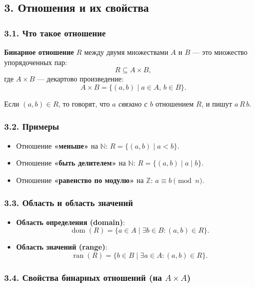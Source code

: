 \subsection{3. Отношения и их свойства}

\subsubsection{3.1. Что такое отношение}

\textbf{Бинарное отношение} $R$ между двумя множествами $A$ и $B$ — это множество упорядоченных пар:
\[
R \subseteq A \times B,
\]
где $A \times B$ — декартово произведение:
\[
A \times B = \{ (a, b) \mid a \in A,\, b \in B \}.
\]

Если $(a, b) \in R$, то говорят, что \textit{$a$ связано с $b$} отношением $R$, и пишут $a\,R\,b$.

\subsubsection{3.2. Примеры}

\begin{itemize}[leftmargin=*]
  \item Отношение \textbf{«меньше»} на $\mathbb{N}$: $R = \{(a, b) \mid a < b\}$.
  \item Отношение \textbf{«быть делителем»} на $\mathbb{N}$: $R = \{(a, b) \mid a \mid b\}$.
  \item Отношение \textbf{«равенство по модулю»} на $\mathbb{Z}$: $a \equiv b \pmod{n}$.
\end{itemize}

\subsubsection{3.3. Область и область значений}

\begin{itemize}[leftmargin=*]
  \item \textbf{Область определения (domain)}:
  \[
  \operatorname{dom}(R) = \{ a \in A \mid \exists b \in B\colon (a,b) \in R \}.
  \]
  \item \textbf{Область значений (range)}:
  \[
  \operatorname{ran}(R) = \{ b \in B \mid \exists a \in A\colon (a,b) \in R \}.
  \]
\end{itemize}

\subsubsection{3.4. Свойства бинарных отношений (на $A \times A$)}

